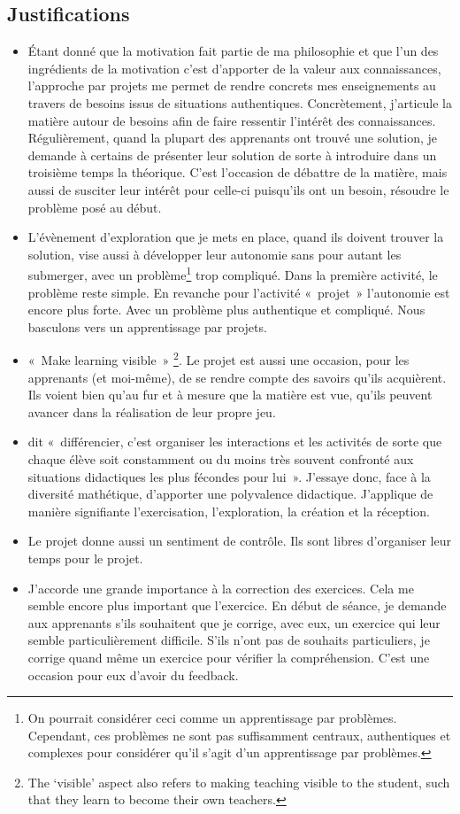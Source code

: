 \subsection{Justifications}
\begin{itemize}
    \item Étant donné que la motivation fait partie de ma philosophie et que l’un des ingrédients de la motivation c’est d’apporter de la valeur aux connaissances\cite{viau1994motivation}, l’approche par projets me permet de rendre concrets mes enseignements au travers de besoins issus de situations authentiques. Concrètement, j'articule la matière autour de besoins afin de faire ressentir l'intérêt des connaissances. Régulièrement, quand la plupart des apprenants ont trouvé une solution, je demande à certains de présenter leur solution de sorte à introduire dans un troisième temps la théorique.  C’est l’occasion de débattre de la matière, mais aussi de susciter leur intérêt pour celle-ci puisqu’ils ont un besoin, résoudre le problème posé au début.
    \item L'évènement d'exploration que je mets en place, quand ils doivent trouver la solution, vise aussi à développer leur autonomie sans pour autant les submerger, avec un problème\footnote{On pourrait considérer ceci comme un apprentissage par problèmes. Cependant, ces problèmes ne sont pas suffisamment centraux, authentiques et complexes pour considérer qu’il s’agit d’un apprentissage par problèmes.} trop compliqué. Dans la première activité, le problème reste simple. En revanche pour l'activité «~projet~» l’autonomie est encore plus forte. Avec un problème plus authentique et compliqué. Nous basculons vers un apprentissage par projets.
    \item «~Make learning visible~» \footnote{The ‘visible’ aspect also refers to making teaching visible to the student, such that they learn to become their own teachers.}\cite{hattie2012visible}. Le projet est aussi une occasion, pour les apprenants (et moi-même), de se rendre compte des savoirs qu'ils acquièrent. Ils voient bien qu'au fur et à mesure que la matière est vue, qu’ils peuvent avancer dans la réalisation de leur propre jeu.
    \item \citet{perrenoud1992differenciation} dit «~différencier, c’est organiser les interactions et les activités de sorte que chaque élève soit constamment ou du moins très souvent confronté aux situations didactiques les plus fécondes pour lui~». J’essaye donc, face à la diversité mathétique, d’apporter une polyvalence didactique. J'applique de manière signifiante l'exercisation, l'exploration, la création et la réception.
    \item Le projet donne aussi un sentiment de contrôle. Ils sont libres d'organiser leur temps pour le projet.
    \item J'accorde une grande importance à la correction des exercices. Cela me semble encore plus important que l'exercice. En début de séance, je demande aux apprenants s'ils souhaitent que je corrige, avec eux, un exercice qui leur semble particulièrement difficile. S’ils n’ont pas de souhaits particuliers, je corrige quand même un exercice pour vérifier la compréhension. C'est une occasion pour eux d’avoir du feedback.
\end{itemize}
